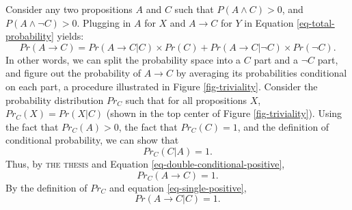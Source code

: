 Consider any two propositions $A$ and $C$ such that $P(A \wedge C) > 0$, and $P(A \wedge \neg C) > 0$.  Plugging in $A$ for $X$ and $A \rightarrow C$ for $Y$ in Equation \ref{eq-total-probability} yields:
%
\begin{equation}
\label{eq-crucial-instance}
Pr(A \rightarrow C) = Pr(A \rightarrow C|C)\times Pr(C) + Pr(A \rightarrow C|\neg C) \times Pr(\neg C).
\end{equation}
%
In other words, we can split the probability space into a $C$ part and a $\neg C$ part, and figure out the probability of $A \rightarrow C$ by averaging its probabilities conditional on each part, a procedure illustrated in Figure \ref{fig-triviality}.  Consider the probability distribution $Pr_C$ such that for all propositions $X$, $Pr_C(X) = Pr(X|C)$ (shown in the top center of Figure \ref{fig-triviality}). Using the fact that $Pr_C(A) >0$, the fact that $Pr_C(C) =1$, and the definition of conditional probability, we can show that
%
\begin{equation}
\label{eq-double-conditional-positive}
Pr_C(C|A) =1.
\end{equation}
%
Thus, by \textsc{the thesis} and Equation \ref{eq-double-conditional-positive},
%
\begin{equation}
\label{eq-single-positive}
Pr_C(A\rightarrow C) = 1.
\end{equation}
%
By the definition of $Pr_C$ and equation \ref{eq-single-positive},
%
\begin{equation}
\label{eq-if-c}
Pr(A \rightarrow C| C) = 1.
\end{equation}

